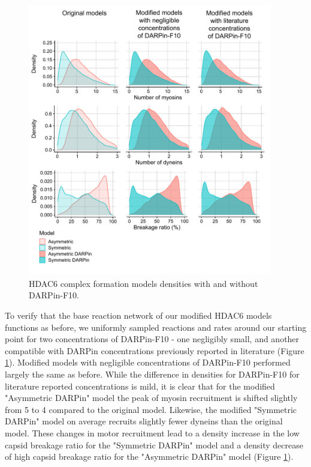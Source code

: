 \begin{figure}
\begin{center}
\includegraphics[width=0.95\textwidth, trim={0cm 0cm 0cm 0cm}, clip]{D_chapters/3_DARPinModels/Density_DARPin.pdf}
\caption[HDAC6 complex formation models densities with and without DARPin-F10]%
{HDAC6 complex formation models densities with and without DARPin-F10.}
\label{figure:darpinDensities}
\end{center}
\end{figure}

To verify that the base reaction network of our modified HDAC6 models functions as before, we uniformly sampled reactions and rates around our starting point for two concentrations of DARPin-F10 - one negligibly small, and another compatible with DARPin concentrations previously reported in literature (Figure \ref{figure:darpinDensities}). Modified models with negligible concentrations of DARPin-F10 performed largely the same as before. While the difference in densities for DARPin-F10 for literature reported concentrations is mild, it is clear that for the modified "Asymmetric DARPin" model the peak of myosin recruitment is shifted slightly from 5 to 4 compared to the original model. Likewise, the modified "Symmetric DARPin" model on average recruits slightly fewer dyneins than the original model. These changes in motor recruitment lead to a density increase in the low capsid breakage ratio for the "Symmetric DARPin" model and a density decrease of high capsid breakage ratio for the "Asymmetric DARPin" model (Figure \ref{figure:darpinDensities}).

